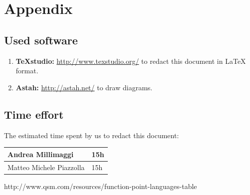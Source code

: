 \documentclass[english]{article}
\providecommand{\tabularnewline}{\\}
\begin{document}
	\listoffigures
	
	\newpage{}


	
	\pagebreak
	
	\pagebreak
	
	\pagebreak
	
	\pagebreak
	
	\pagebreak
	\section{Appendix}


	\subsection{Used software}
	\begin{enumerate}
		\item \textbf{TeXstudio:} \url{http://www.texstudio.org/} to redact this document in {\LaTeX} format.
		\item \textbf{Astah:} \url{http://astah.net/} to draw diagrams.		
	\end{enumerate}
	
	
	\subsection{Time effort}
	The estimated time spent by us to redact this document:
	\begin{center}
		\begin{adjustbox}{max width=\textwidth}	
			\begin{tabular}{|l|>{\raggedright}p{15cm}|}
				
				\hline  Andrea Millimaggi & 15h \tabularnewline
				\hline 	Matteo Michele Piazzolla & 15h \tabularnewline
				\hline 		
			\end{tabular}
		\end{adjustbox}
	\end{center}	
\begin{thebibliography}{5}
	http://www.qsm.com/resources/function-point-languages-table
\end{thebibliography}
\end{document}

